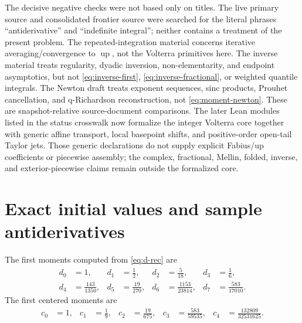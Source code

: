 \documentclass[11pt,oneside]{article}
\theoremstyle{definition}
\theoremstyle{remark}
\newcommand{\Up}{\operatorname{up}}
\newcommand{\1}{\mathbf 1}
\begin{document}
The decisive negative checks were not based only on titles.  The live primary
source and consolidated frontier source were searched for the literal phrases
``antiderivative'' and ``indefinite integral''; neither contains a treatment of
the present problem.  The repeated-integration material concerns iterative
averaging/convergence to \(\Up\), not the Volterra primitives here.  The
inverse material treats regularity, dyadic inversion, non-elementarity, and
endpoint asymptotics, but not \eqref{eq:inverse-first},
\eqref{eq:inverse-fractional}, or weighted quantile integrals.  The Newton draft
treats exponent sequences, sinc products, Prouhet cancellation, and
q-Richardson reconstruction, not \eqref{eq:moment-newton}.  These are
snapshot-relative source-document comparisons.  The later Lean modules listed
in the status crosswalk now formalize the integer Volterra core together with
generic affine transport, local basepoint shifts, and positive-order open-tail
Taylor jets.  Those generic declarations do not supply explicit Fabius/up
coefficients or piecewise assembly; the complex, fractional, Mellin, folded,
inverse, and exterior-piecewise claims remain outside the formalized core.

\section{Exact initial values and sample antiderivatives}

The first moments computed from \eqref{eq:d-rec} are
\begin{align*}
 d_0&=1,&
 d_1&=\frac12,&
 d_2&=\frac5{18},&
 d_3&=\frac16,\\
 d_4&=\frac{143}{1350},&
 d_5&=\frac{19}{270},&
 d_6&=\frac{1153}{23814},&
 d_7&=\frac{583}{17010}.
\end{align*}
The first centered moments are
\begin{align*}
 c_0&=1,&
 c_1&=\frac19,&
 c_2&=\frac{19}{675},&
 c_3&=\frac{583}{59535},&
 c_4&=\frac{132809}{32531625}.
\end{align*}
\end{document}
